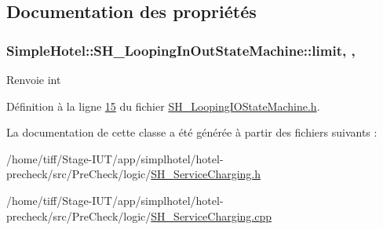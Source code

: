 \subsection{Documentation des propriétés}
\hypertarget{classSimpleHotel_1_1SH__LoopingInOutStateMachine_a5039255365e39a63520818168200b686}{
\subsubsection[{limit}]{\setlength{\rightskip}{0pt plus 5cm}Simple\-Hotel\-::\-S\-H\-\_\-\-Looping\-In\-Out\-State\-Machine\-::limit\hspace{0.3cm}{\ttfamily [read]}, {\ttfamily [write]}, {\ttfamily [inherited]}}}\label{classSimpleHotel_1_1SH__LoopingInOutStateMachine_a5039255365e39a63520818168200b686}
\begin{DoxyReturn}{Renvoie}
int 
\end{DoxyReturn}


Définition à la ligne \hyperlink{SH__LoopingIOStateMachine_8h_source_l00015}{15} du fichier \hyperlink{SH__LoopingIOStateMachine_8h_source}{S\-H\-\_\-\-Looping\-I\-O\-State\-Machine.\-h}.



La documentation de cette classe a été générée à partir des fichiers suivants \-:\begin{DoxyCompactItemize}
\item 
/home/tiff/\-Stage-\/\-I\-U\-T/app/simplhotel/hotel-\/precheck/src/\-Pre\-Check/logic/\hyperlink{SH__ServiceCharging_8h}{S\-H\-\_\-\-Service\-Charging.\-h}\item 
/home/tiff/\-Stage-\/\-I\-U\-T/app/simplhotel/hotel-\/precheck/src/\-Pre\-Check/logic/\hyperlink{SH__ServiceCharging_8cpp}{S\-H\-\_\-\-Service\-Charging.\-cpp}\end{DoxyCompactItemize}
